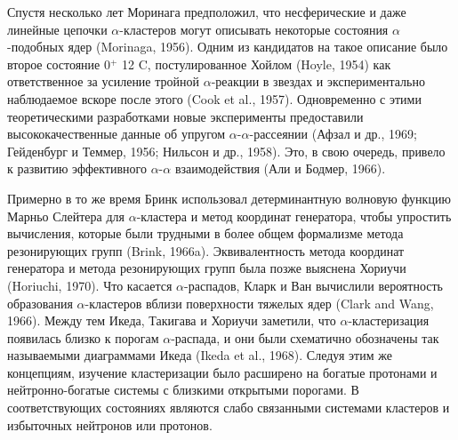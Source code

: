 \documentclass[fontsize=14pt]{scrarticle}
\begin{document}
Спустя несколько лет Моринага предположил, что несферические и даже линейные цепочки $\alpha$-кластеров могут описывать некоторые состояния $\alpha$-подобных ядер (Morinaga, 1956). Одним из кандидатов на такое описание было второе состояние 0$^{+}$ 12 C, постулированное Хойлом (Hoyle, 1954) как ответственное за усиление тройной $\alpha$-реакции в звездах и экспериментально наблюдаемое вскоре после этого (Cook et al., 1957). Одновременно с этими теоретическими разработками новые эксперименты предоставили высококачественные данные об упругом $\alpha$-$\alpha$-рассеянии (Афзал и др., 1969; Гейденбург и Теммер, 1956; Нильсон и др., 1958). Это, в свою очередь, привело к развитию эффективного $\alpha$-$\alpha$ взаимодействия (Али и Бодмер, 1966). 

Примерно в то же время Бринк использовал детерминантную волновую функцию Марньо Слейтера для $\alpha$-кластера и метод координат генератора, чтобы упростить вычисления, которые были трудными в более общем формализме метода резонирующих групп (Brink, 1966a). Эквивалентность метода координат генератора и метода резонирующих групп была позже выяснена Хориучи (Horiuchi, 1970). Что касается $\alpha$-распадов, Кларк и Ван вычислили вероятность образования $\alpha$-кластеров вблизи поверхности тяжелых ядер (Clark and Wang, 1966). Между тем Икеда, Такигава и Хориучи заметили, что $\alpha$-кластеризация появилась близко к порогам $\alpha$-распада, и они были схематично обозначены так называемыми диаграммами Икеда (Ikeda et al., 1968). Следуя этим же концепциям, изучение кластеризации было расширено на богатые протонами и нейтронно-богатые системы с близкими открытыми порогами. В соответствующих состояниях являются слабо связанными системами кластеров и избыточных нейтронов или протонов. 
\end{document}
